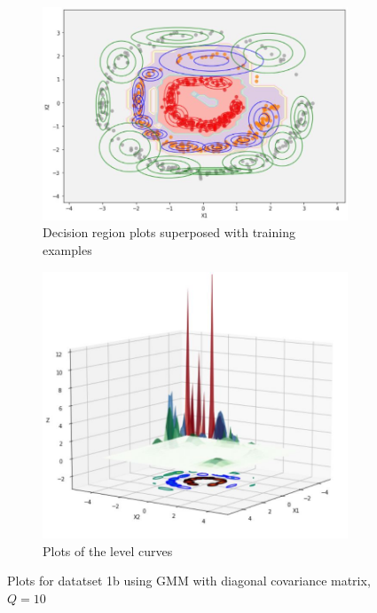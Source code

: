 \documentclass[11pt]{article}
\begin{document}
\begin{figure}[h]
\centering
	\begin{subfigure}[b]{0.45\textwidth}
	\centering
	\includegraphics[scale=0.3]{dataset1b_k10_diagonalC_GMM_2D.jpg}
	\caption{Decision region plots superposed with training examples}
	\label{fig:fig2.2.3.1}
	\end{subfigure}
	\hfill
	\begin{subfigure}[b]{0.45\textwidth}
	\centering
	\includegraphics[scale=0.3]{dataset1b_k10_diagonalC_GMM_3D.jpg}
	\caption{Plots of the level curves}
	\label{fig:fig2.2.3.2}
	\end{subfigure}
\caption{Plots for datatset 1b using GMM with diagonal covariance matrix, $Q= 10$}
\label{fig:fig1.2.1}
\end{figure}
\end{document}
